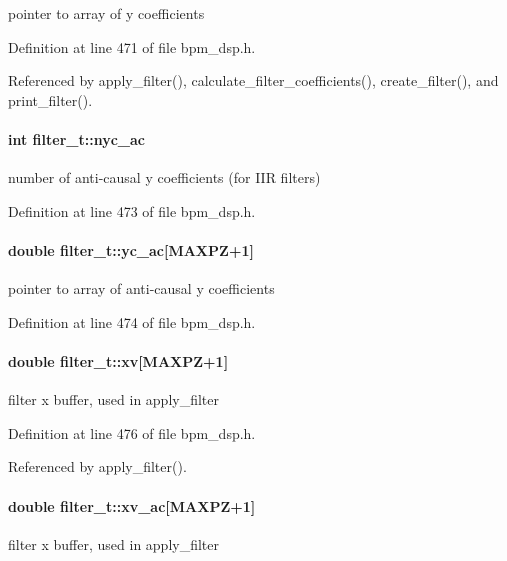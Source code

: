 pointer to array of y coefficients 

Definition at line 471 of file bpm\_\-dsp.h.

Referenced by apply\_\-filter(), calculate\_\-filter\_\-coefficients(), create\_\-filter(), and print\_\-filter().
\paragraph[nyc\_\-ac]{\setlength{\rightskip}{0pt plus 5cm}int {\bf filter\_\-t::nyc\_\-ac}}\hfill\label{structfilter__t_0efd9c9142e1de7ed343838b73c6bbca}


number of anti-causal y coefficients (for IIR filters) 

Definition at line 473 of file bpm\_\-dsp.h.
\paragraph[yc\_\-ac]{\setlength{\rightskip}{0pt plus 5cm}double {\bf filter\_\-t::yc\_\-ac}[MAXPZ+1]}\hfill\label{structfilter__t_a51fea51992b0ad09ad85a504ce2223e}


pointer to array of anti-causal y coefficients 

Definition at line 474 of file bpm\_\-dsp.h.
\paragraph[xv]{\setlength{\rightskip}{0pt plus 5cm}double {\bf filter\_\-t::xv}[MAXPZ+1]}\hfill\label{structfilter__t_26b1836d03ff46c9d76a9129ae225820}


filter x buffer, used in apply\_\-filter 

Definition at line 476 of file bpm\_\-dsp.h.

Referenced by apply\_\-filter().
\paragraph[xv\_\-ac]{\setlength{\rightskip}{0pt plus 5cm}double {\bf filter\_\-t::xv\_\-ac}[MAXPZ+1]}\hfill\label{structfilter__t_48fa496d9b7b4c496ae3209a4d8004d6}


filter x buffer, used in apply\_\-filter 


